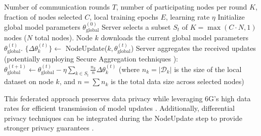 \documentclass{article}
\begin{document}
\begin{algorithm}
\caption{Federated cGAN Synchronization (FedAvg Variant)}
\label{alg:fl_sync}
\begin{algorithmic}[1]
\Require Number of communication rounds \(T\), number of participating nodes per round \(K\), fraction of nodes selected \(C\), local training epochs \(E\), learning rate \(\eta\)
\State Initialize global model parameters \(\theta_{\mathrm{global}}^{(0)}\)
    \State Server selects a subset \(S_t\) of \(K = \max(C \cdot N, 1)\) nodes (\(N\) total nodes).
        \State Node \(k\) downloads the current global model parameters \(\theta_{\mathrm{global}}^{(t)}\).
        \State \(\{\Delta \theta_k^{(t)}\} \leftarrow \) NodeUpdate(\(k, \theta_{\mathrm{global}}^{(t)}\)) 
    \EndFor
    \State Server aggregates the received updates (potentially employing Secure Aggregation techniques \cite{Bonawitz2017SecureAgg}):
    \State \(\theta_{\mathrm{global}}^{(t+1)} \leftarrow \theta_{\mathrm{global}}^{(t)} - \eta \sum_{k \in S_t} \frac{n_k}{n} \Delta \theta_k^{(t)} \) (where \(n_k= |\mathcal{D}_k|\) is the size of the local dataset on node \(k\), and \(n = \sum n_k\) is the total data size across selected nodes)
\EndFor
\end{algorithmic}
\end{algorithm}

This federated approach preserves data privacy while leveraging 6G's high data rates for efficient transmission of model updates \cite{Gkonis2024LeveragingNDAF, Li2024TrustworthyACO}. Additionally, differential privacy techniques can be integrated during the NodeUpdate step to provide stronger privacy guarantees \cite{Abadi2016DP}.
\end{document}
